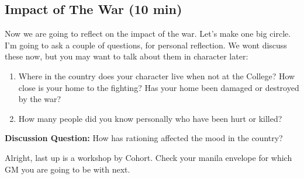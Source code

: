 \documentclass[green]{GL2020}
\begin{document}
\subsection*{Impact of The War (10 min)}
Now we are going to reflect on the impact of the war. Let’s make one big circle. I’m going to ask a couple of questions, for personal reflection. We wont discuss these now, but you may want to talk about them in character later:
\begin{enumerate}
	\item Where in the country does your character live when not at the College? How close is your home to the fighting? Has your home been damaged or destroyed by the war?
	\item How many people did you know personally who have been hurt or killed?
\end{enumerate}

\textbf{Discussion Question:} How has rationing affected the mood in the country?


Alright, last up is a workshop by Cohort. Check your manila envelope for which GM you are going to be with next.
\end{document}
